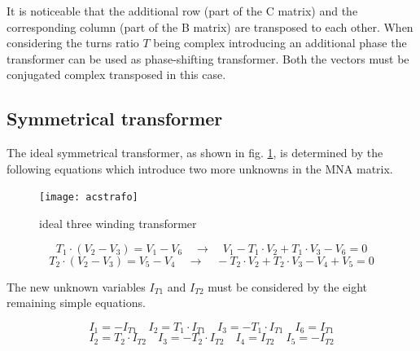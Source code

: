 \documentclass[10pt]{report}
\begin{document}
It is noticeable that the additional row (part of the C matrix) and the
corresponding column (part of the B matrix) are transposed to each
other.  When considering the turns ratio $T$ being complex introducing
an additional phase the transformer can be used as phase-shifting
transformer.  Both the vectors must be conjugated complex transposed
in this case.

\subsection{Symmetrical transformer}

The ideal symmetrical transformer, as shown in fig.
\ref{fig:acstrafo}, is determined by the following equations which
introduce two more unknowns in the MNA matrix.

\begin{figure}[ht]
\begin{center}
\texttt{[image: acstrafo]}
\end{center}
\caption{ideal three winding transformer}
\label{fig:acstrafo}
\end{figure}
\FloatBarrier

\begin{equation}
T_{1}\cdot\left(V_{2} - V_{3}\right) = V_{1} - V_{6}
\quad \rightarrow \quad
V_{1} - T_{1}\cdot V_{2} + T_{1}\cdot V_{3} - V_{6} = 0
\end{equation}
\begin{equation}
T_{2}\cdot\left(V_{2} - V_{3}\right) = V_{5} - V_{4}
\quad \rightarrow \quad
- T_{2}\cdot V_{2} + T_{2}\cdot V_{3} - V_{4} + V_{5} = 0
\label{eq:acstrafo}
\end{equation}

The new unknown variables $I_{T1}$ and $I_{T2}$ must be considered by
the eight remaining simple equations.

\begin{equation}
I_{1} = -I_{T1} \quad I_{2} = T_{1}\cdot I_{T1} \quad I_{3} = -T_{1}\cdot I_{T1} \quad I_{6} = I_{T1}
\end{equation}
\begin{equation}
I_{2} = T_{2}\cdot I_{T2} \quad I_{3} = -T_{2}\cdot I_{T2} \quad I_{4} = I_{T2} \quad I_{5} = -I_{T2}
\end{equation}
\end{document}
